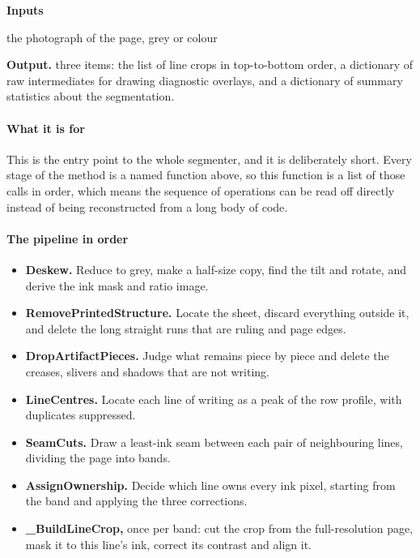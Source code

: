 \noindent\textbf{Inputs}
\begin{description}[leftmargin=2.2em,style=nextline,font=\normalfont\ttfamily]\setlength\itemsep{1pt}
  \item[{page}] \normalfont the photograph of the page, grey or colour
\end{description}

\noindent\textbf{Output.} three items: the list of line crops in top-to-bottom order, a dictionary of raw intermediates for drawing diagnostic overlays, and a dictionary of summary statistics about the segmentation.


\paragraph{What it is for}
This is the entry point to the whole segmenter, and it is deliberately short. Every stage of the method is a named function above, so this function is a list of those calls in order, which means the sequence of operations can be read off directly instead of being reconstructed from a long body of code.


\paragraph{The pipeline in order}

\begin{itemize}\setlength\itemsep{0pt}
  \item \textbf{Deskew.} Reduce to grey, make a half-size copy, find the tilt and rotate, and derive the ink mask and ratio image.
  \item \textbf{RemovePrintedStructure.} Locate the sheet, discard everything outside it, and delete the long straight runs that are ruling and page edges.
  \item \textbf{DropArtifactPieces.} Judge what remains piece by piece and delete the creases, slivers and shadows that are not writing.
  \item \textbf{LineCentres.} Locate each line of writing as a peak of the row profile, with duplicates suppressed.
  \item \textbf{SeamCuts.} Draw a least-ink seam between each pair of neighbouring lines, dividing the page into bands.
  \item \textbf{AssignOwnership.} Decide which line owns every ink pixel, starting from the band and applying the three corrections.
  \item \textbf{\_BuildLineCrop,} once per band: cut the crop from the full-resolution page, mask it to this line's ink, correct its contrast and align it.
\end{itemize}

